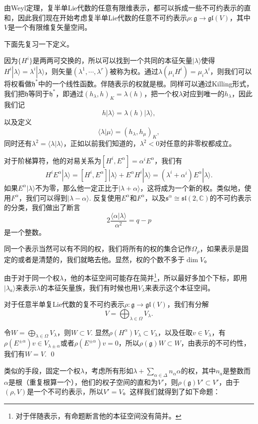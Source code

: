 \documentclass[9pt]{extarticle}
\newcommand{\cc}{\mathbb{C}}
\newcommand{\lag}{{\mathfrak{g}}}
\begin{document}
由Weyl定理，复半单Lie代数的任意有限维表示，都可以拆成一些不可约表示的直和，因此我们现在开始考虑复半单Lie代数的任意不可约表示$\rho:\lag\to \mathfrak{gl}(V)$，其中$V$是一个有限维复矢量空间。

下面先复习一下定义。

\para 因为$\{H^i\}$是两两可交换的，所以可以找到一个共同的本征矢量$|\lambda\rangle$使得$H^i|\lambda\rangle=\lambda^i|\lambda\rangle$，则矢量$(\lambda^1,\cdots,\lambda^r)$被称为权。通过$\lambda(\mu_iH^i)=\mu_i\lambda^i$，则我们可以将权看做$\mathfrak{h}^*$中的一个线性函数。伴随表示的权就是根。同样可以通过Killing形式，我们把$\mathfrak{h}$等同于$\mathfrak{h}^*$，即通过$(h_\lambda,h)_K=\lambda(h)$，把一个权$\lambda$对应到唯一的$h_\lambda$，因此我们记
\[
	h|\lambda\rangle=\lambda(h)|\lambda\rangle,
\]
以及定义
\[
	\langle \lambda|\mu\rangle=(h_\lambda,h_\mu)_K,
\]
同时还有$\lambda^2=\langle \lambda|\lambda\rangle$，正如以前我们知道的，$\lambda^2<0$对任意的非零权都成立。

对于阶梯算符，他的对易关系为$[H^i,E^\alpha]=\alpha^iE^\alpha$，我们有
\[
	H^iE^\alpha|\lambda\rangle=[H^i,E^\alpha]|\lambda\rangle+E^\alpha H^i|\lambda\rangle=(\lambda^i+\alpha^i)E^\alpha |\lambda\rangle.
\]
如果$E^\alpha |\lambda\rangle$不为零，那么他一定正比于$|\lambda+\alpha\rangle$，这将成为一个新的权。类似地，使用$F^\alpha$，我们可以得到$|\lambda-\alpha\rangle$. 反复使用$E^\alpha$和$F^\alpha$，以及$\mathfrak{s}^\alpha\cong \mathfrak{sl}(2,\cc)$的不可约表示的分类，我们做出了断言
\[
	2\frac{\langle\alpha|\lambda\rangle}{\alpha^2}=q-p
\]
是一个整数。

同一个表示当然可以有不同的权，我们将所有的权的集合记作$\Omega_\rho$，如果表示是固定的或者是清楚的，我们就略去他。显然，权的个数不多于$\dim V$。

\para 由于对于同一个权$\lambda$，他的本征空间可能存在简并\footnote{对于伴随表示，有命题断言他的本征空间没有简并。}，所以最好多加个下标，即用$|\lambda_a\rangle$来表示$\lambda$的本征矢量族，我们有时候也用$V_{\lambda}$来表示这个本征空间。

\pro 对于任意半单复Lie代数的复不可约表示$\rho:\lag\to \mathfrak{gl}(V)$，我们有分解
\[
	V=\bigoplus_{\lambda\in\Omega} V_\lambda.
\]

\proof 令$W=\bigoplus_{\lambda\in\Omega} V_\lambda$，则$W\subset V$. 显然$\rho(H^\alpha)V_\lambda\subset V_\lambda$，以及任取$v\in V_\lambda$，有$\rho(E^{\pm\alpha})v \in V_{\lambda\pm\alpha}$或者$\rho(E^{\pm\alpha})v=0$，所以$\rho(\lag)W\subset W$，由表示的不可约性，我们有$W=V$. \qed

类似的手段，固定一个权$\lambda$，考虑所有形如$\lambda+\sum_{\alpha\in\Delta} n_\alpha\alpha$的权，其中$n_a$是整数而$\alpha$是根（重复根算一个），他们的权子空间的直和为$V'$，则$\rho(\lag)V'\subset V'$，由于$(\rho,V)$是一个不可约表示，所以$V'=V$。这样我们就得到了如下命题：
\end{document}
